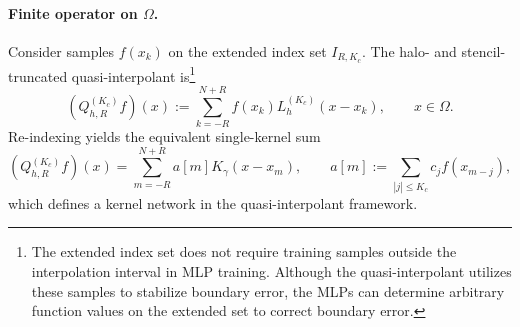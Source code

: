 \documentclass[11pt]{article}
\begin{document}
\paragraph{Finite operator on $\Omega$.}
Consider samples $f(x_k)$ on the extended index set $I_{R,K_c}$. The halo- and stencil-truncated quasi-interpolant is\footnote{The extended index set does not require training samples outside the interpolation interval in MLP training. Although the quasi-interpolant utilizes these samples to stabilize boundary error, the MLPs can determine arbitrary function values on the extended set to correct boundary error.}
\begin{equation}
(Q_{h,R}^{(K_c)}f)(x) := \sum_{k=-R}^{N+R} f(x_k)L_h^{(K_c)}(x-x_k),
\qquad x\in\Omega.
\label{eq:qh-truncated}
\end{equation}
Re-indexing yields the equivalent single-kernel sum
\begin{equation}
(Q_{h,R}^{(K_c)}f)(x)=\sum_{m=-R}^{N+R} a[m]K_\gamma(x-x_m),
\qquad
 a[m]:=\sum_{|j|\le K_c} c_j f(x_{m-j}),
\label{eq:single-kernel-sum}
\end{equation}
which defines a kernel network in the quasi-interpolant framework.
\end{document}
